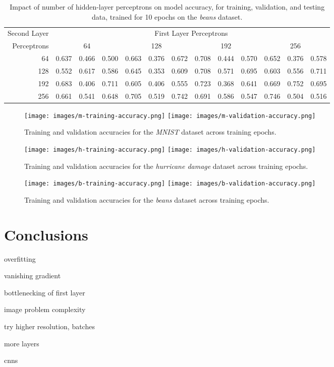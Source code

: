 \documentclass{article}
\begin{document}
\begin{table}[h!]
	\centering
	\caption{Impact of number of hidden-layer perceptrons on model accuracy, for training, validation, and testing data, trained for 10 epochs on the \emph{beans} dataset.}
	\label{tbl:b-2l}
	\begin{tabular}{r|ccc|ccc|ccc|ccc}
		Second Layer & \multicolumn{12}{c}{First Layer Perceptrons} \\
		Perceptrons & \multicolumn{3}{c}{64} & \multicolumn{3}{c}{128} & \multicolumn{3}{c}{192} & \multicolumn{3}{c}{256} \\
		\hline
		64 & 0.637 & 0.466 & 0.500 & 0.663 & 0.376 & 0.672 & 0.708 & 0.444 & 0.570 & 0.652 & 0.376 & 0.578 \\
		128 & 0.552 & 0.617 & 0.586 & 0.645 & 0.353 & 0.609 & 0.708 & 0.571 & 0.695 & 0.603 & 0.556 & 0.711 \\
		192 & 0.683 & 0.406 & 0.711 & 0.605 & 0.406 & 0.555 & 0.723 & 0.368 & 0.641 & 0.669 & 0.752 & 0.695 \\
		256 & 0.661 & 0.541 & 0.648 & 0.705 & 0.519 & 0.742 & 0.691 & 0.586 & 0.547 & 0.746 & 0.504 & 0.516
	\end{tabular}
\end{table}

\begin{figure}[h!]
	\centering
	\texttt{[image: images/m-training-accuracy.png]}
	\texttt{[image: images/m-validation-accuracy.png]}
	\caption{Training and validation accuracies for the \emph{MNIST} dataset across training epochs.}
	\label{fig:m-2l}
\end{figure}

\begin{figure}[h!]
	\centering
	\texttt{[image: images/h-training-accuracy.png]}
	\texttt{[image: images/h-validation-accuracy.png]}
	\caption{Training and validation accuracies for the \emph{hurricane damage} dataset across training epochs.}
	\label{fig:h-2l}
\end{figure}

\begin{figure}[h!]
	\centering
	\texttt{[image: images/b-training-accuracy.png]}
	\texttt{[image: images/b-validation-accuracy.png]}
	\caption{Training and validation accuracies for the \emph{beans} dataset across training epochs.}
	\label{fig:b-2l}
\end{figure}

\FloatBarrier

\section{Conclusions}

overfitting

vanishing gradient

bottlenecking of first layer

image problem complexity

try higher resolution, batches

more layers

cnns



\end{document}
